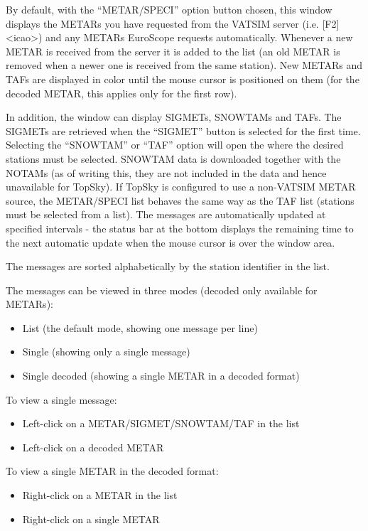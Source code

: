 \documentclass[11pt,a4paper]{memoir}
\newcommand{\colorref}[1]{\textit{\hyperref[#1]{\StrDel{#1}{color:}}}}
\begin{document}
By default, with the “METAR/SPECI” option button chosen, this window displays the METARs you have requested from the VATSIM server (i.e. [F2] <icao>) and any METARs EuroScope requests automatically. Whenever a new METAR is received from the server it is added to the list (an old METAR is removed when a newer one is received from the same station). New METARs and TAFs are displayed in \colorref{color:Warning} color until the mouse cursor is positioned on them (for the decoded METAR, this applies only for the first row).

In addition, the window can display SIGMETs, SNOWTAMs and TAFs. The SIGMETs are retrieved when the “SIGMET” button is selected for the first time. Selecting the “SNOWTAM” or “TAF” option will open the \textit{} where the desired stations must be selected. SNOWTAM data is downloaded together with the NOTAMs (as of writing this, they are not included in the data and hence unavailable for TopSky). If TopSky is configured to use a non-VATSIM METAR source, the METAR/SPECI list behaves the same way as the TAF list (stations must be selected from a list). The messages are automatically updated at specified intervals - the status bar at the bottom displays the remaining time to the next automatic update when the mouse cursor is over the window area.

The messages are sorted alphabetically by the station identifier in the list.

The messages can be viewed in three modes (decoded only available for METARs):

\begin{itemize}
    \item List (the default mode, showing one message per line)
    \item Single (showing only a single message)
    \item Single decoded (showing a single METAR in a decoded format)
\end{itemize}

To view a single message:

\begin{itemize}
    \item Left-click on a METAR/SIGMET/SNOWTAM/TAF in the list
    \item Left-click on a decoded METAR
\end{itemize}

To view a single METAR in the decoded format:

\begin{itemize}
    \item Right-click on a METAR in the list
    \item Right-click on a single METAR
\end{itemize}
\end{document}
